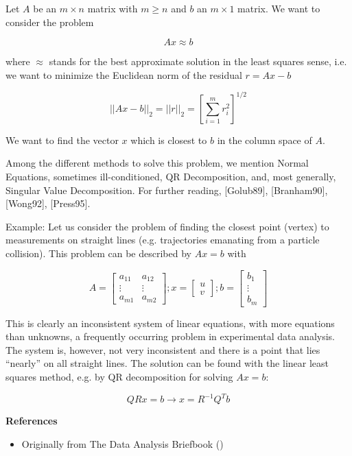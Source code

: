 \documentclass[12pt]{article}
\begin{document}
Let $A$ be an $m \times n$ matrix with $m \ge n$  and $b$ an $m \times 1$ matrix. We want to consider the problem

$$ Ax \approx b $$

where $\approx$ stands for the best approximate solution in the least squares sense, i.e. we want to minimize the Euclidean norm of the residual $r = Ax - b$

$$ ||Ax-b||_2 = ||r||_2 = \left[\sum_{i=1}^m r_i^2 \right]^{1/2} $$

We want to find the vector $x$ which is closest to $b$ in the column space of $A$.

Among the different methods to solve this problem, we mention Normal Equations, sometimes ill-conditioned, QR Decomposition, and, most generally, Singular Value Decomposition. For further reading, [Golub89], [Branham90], [Wong92], [Press95].

Example: Let us consider the problem of finding the closest point (vertex) to measurements on straight lines (e.g. trajectories emanating from a particle collision). This problem can be described by $Ax = b$ with

$$ A = \begin{bmatrix}a_{11} & a_{12} \\ \vdots & \vdots \\ a_{m1} & a_{m2} \end{bmatrix} ; x = \begin{bmatrix}u \\ v \end{bmatrix} ;b = \begin{bmatrix} b_1 \\ \vdots \\ b_m \end{bmatrix} $$

This is clearly an inconsistent system of linear equations, with more equations than unknowns, a frequently occurring problem in experimental data analysis. The system is, however, not very inconsistent and there is a point that lies ``nearly'' on all straight lines. The solution can be found with the linear least squares method, e.g. by QR decomposition for solving $Ax = b$:

$$ QRx = b \rightarrow x = R^{-1}Q^Tb $$ 

{\bf References}

\begin{itemize}
\item Originally from The Data Analysis Briefbook
()
\end{itemize}
\end{document}
